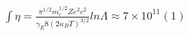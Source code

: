 

\subsubsection{$∫\eta=\frac{\pi^{1/2}m^{1/2}_{e}Ze^{2}c^{2}}{\gamma_{E}8(2\kappa_{B}T)^{3/2}} lnΛ\approx7×10^{11}      (1)$}


